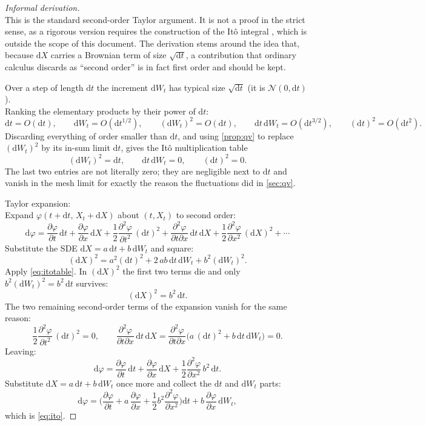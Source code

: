 \documentclass[11pt]{report}
\newcommand{\dd}{\mathrm{d}}
\newcommand{\dW}{\dd W_t}
\newcommand{\dt}{\dd t}
\newcommand{\drift}{a}
\newcommand{\diff}{b}
\theoremstyle{plain}
\theoremstyle{definition}
\theoremstyle{remark}
\numberwithin{equation}{chapter}
\begin{document}
\begin{proof}[Informal derivation]
  \leavevmode\\
This is the standard second-order Taylor argument. It is not a proof in the
strict sense, as a rigorous version requires the construction of the It\^o
integral \cite[Sec.~4.2.1]{shreve2004}, which is outside the scope of this document.
The derivation stems around the idea that, because $\dd X$ carries a Brownian term of size
$\sqrt{\dt}$, a contribution that ordinary calculus discards as ``second
order'' is in fact first order and should be kept.

\medskip
\noindent
Over a step of length $\dt$ the increment $\dW$ has typical size $\sqrt{\dt}$
(it is $\mathcal N(0,\dt)$).
\\Ranking the elementary products by their power of
$\dt$:
\[
  \dt = O(\dt), \qquad
  \dW = O(\dt^{1/2}), \qquad
  (\dW)^2 = O(\dt), \qquad
  \dt\,\dW = O(\dt^{3/2}), \qquad
  (\dt)^2 = O(\dt^2).
\]
Discarding everything of order smaller than $\dt$, and using \cref{prop:qv} to
replace $(\dW)^2$ by its in-sum limit $\dt$, gives the It\^o
multiplication table
\begin{equation}\label{eq:itotable}
  (\dW)^2=\dt, \qquad \dt\,\dW=0, \qquad (\dt)^2=0 .
\end{equation}
The last two entries are not literally zero; they are negligible next to $\dt$
and vanish in the mesh limit for exactly the reason the fluctuations did in
\cref{sec:qv}.

\medskip
\noindent Taylor expansion:
\leavevmode\\
Expand $\varphi(t+\dt,\,X_t+\dd X)$ about $(t,X_t)$ to second order:
\[
  \dd \varphi = \frac{\partial\varphi}{\partial t}\,\dt + \frac{\partial\varphi}{\partial x}\,\dd X
        + \frac{1}{2} \frac{\partial^2\varphi}{\partial t^2}\,(\dt)^2
        + \frac{\partial^2\varphi}{\partial t\partial x}\,\dt\,\dd X
        + \frac{1}{2} \frac{\partial^2\varphi}{\partial x^2}\,(\dd X)^2
        + \cdots
\]
Substitute the SDE $\dd X = \drift\,\dt + \diff\,\dW$ and square:
\[
  (\dd X)^2 = \drift^2(\dt)^2 + 2\,\drift\diff\,\dt\,\dW + \diff^2(\dW)^2 .
\]
Apply \eqref{eq:itotable}. In $(\dd X)^2$ the first two terms die and only
$\diff^2(\dW)^2=\diff^2\,\dt$ survives:
\[
  (\dd X)^2 = \diff^2\,\dt .
\]
The two remaining second-order terms of the expansion vanish for the same
reason:
\[
  \frac{1}{2} \frac{\partial^2\varphi}{\partial t^2}\,(\dt)^2 = 0, \qquad
  \frac{\partial^2\varphi}{\partial t\partial x}\,\dt\,\dd X
     = \frac{\partial^2\varphi}{\partial t\partial x}\big(\drift\,(\dt)^2 + \diff\,\dt\,\dW\big) = 0 .
\]
Leaving:
\[
  \dd \varphi = \frac{\partial\varphi}{\partial t}\,\dt + \frac{\partial\varphi}{\partial x}\,\dd X + \frac{1}{2} \frac{\partial^2\varphi}{\partial x^2}\,\diff^2\,\dt .
\]
Substitute $\dd X = \drift\,\dt + \diff\,\dW$ once more and collect the $\dt$
and $\dW$ parts:
\[
  \dd \varphi = \Big( \frac{\partial\varphi}{\partial t} + \drift\, \frac{\partial\varphi}{\partial x} + \frac{1}{2} \diff^2 \frac{\partial^2\varphi}{\partial x^2} \Big)\dt
        + \diff\, \frac{\partial\varphi}{\partial x} \,\dW ,
\]
which is \eqref{eq:ito}.
\end{proof}
\end{document}
